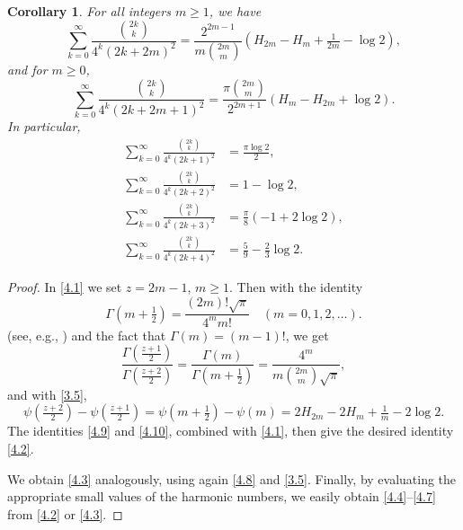 \documentclass{amsart}
\newtheorem{corollary}[theorem]{Corollary}
\theoremstyle{definition}
\theoremstyle{remark}
\numberwithin{equation}{section}
\begin{document}
\begin{corollary}\label{cor:4.2}
For all integers $m\geq 1$, we have
\begin{equation}\label{4.2}
\sum_{k=0}^\infty\frac{\binom{2k}{k}}{4^k(2k+2m)^2}
=\frac{2^{2m-1}}{m\binom{2m}{m}}\left(H_{2m}-H_m+\tfrac{1}{2m}-\log{2}\right),
\end{equation}
and for $m\geq 0$, 
\begin{equation}\label{4.3}
\sum_{k=0}^\infty\frac{\binom{2k}{k}}{4^k(2k+2m+1)^2}
=\frac{\pi\binom{2m}{m}}{2^{2m+1}}\left(H_m-H_{2m}+\log{2}\right).
\end{equation}
In particular,
\begin{align}
\sum_{k=0}^\infty\frac{\binom{2k}{k}}{4^k(2k+1)^2}
&=\frac{\pi\log{2}}{2},\label{4.4}\\
\sum_{k=0}^\infty\frac{\binom{2k}{k}}{4^k(2k+2)^2}
&=1-\log{2},\label{4.5}\\
\sum_{k=0}^\infty\frac{\binom{2k}{k}}{4^k(2k+3)^2}
&=\frac{\pi}{8}(-1+2\log{2}),\label{4.6}\\
\sum_{k=0}^\infty\frac{\binom{2k}{k}}{4^k(2k+4)^2}
&=\frac{5}{9}-\frac{2}{3}\log{2}.\label{4.7}
\end{align}
\end{corollary}

\begin{proof}
In \eqref{4.1} we set $z=2m-1$, $m\geq 1$. Then with the identity
\begin{equation}\label{4.8}
\Gamma(m+\tfrac{1}{2}) = \frac{(2m)!\sqrt{\pi}}{4^m m!}\quad (m=0,1,2,\ldots).
\end{equation}
(see, e.g., \cite[eq.~8.339.2]{GR}) and the fact that $\Gamma(m)=(m-1)!$, we get
\begin{equation}\label{4.9}
\frac{\Gamma(\frac{z+1}{2})}{\Gamma(\frac{z+2}{2})}
=\frac{\Gamma(m)}{\Gamma(m+\frac{1}{2})}
=\frac{4^m}{m\binom{2m}{m}\sqrt{\pi}},
\end{equation}
and with \eqref{3.5},
\begin{equation}\label{4.10}
\psi(\tfrac{z+2}{2})-\psi(\tfrac{z+1}{2})=\psi(m+\tfrac{1}{2})-\psi(m)
= 2H_{2m}-2H_m+\tfrac{1}{m}-2\log{2}.
\end{equation}
The identities \eqref{4.9} and \eqref{4.10}, combined with \eqref{4.1}, then
give the desired identity \eqref{4.2}.

We obtain \eqref{4.3} analogously, using again \eqref{4.8} and \eqref{3.5}.
Finally, by evaluating the appropriate small values of the harmonic numbers,
we easily obtain \eqref{4.4}--\eqref{4.7} from \eqref{4.2} or \eqref{4.3}.
\end{proof}
\end{document}
